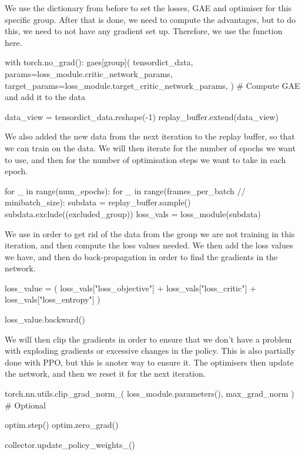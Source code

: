 We use the dictionary from before to set the losses, GAE and optimiser for this specific group. After that is done, we need to compute the advantages, but to do this, we need to not have any gradient set up. Therefore, we use the  function here.

\begin{mpy}
        with torch.no_grad():
            gaes[group](
                tensordict_data,
                params=loss_module.critic_network_params,
                target_params=loss_module.target_critic_network_params,
            )  # Compute GAE and add it to the data
    
        data_view = tensordict_data.reshape(-1)
        replay_buffer.extend(data_view)
\end{mpy}

We also added the new data from the next iteration to the replay buffer, so that we can train on the data. We will then iterate for the number of epochs we want to use, and then for the number of optimisation steps we want to take in each epoch.

\begin{mpy}
        for _ in range(num_epochs):
            for _ in range(frames_per_batch // minibatch_size):
                subdata = replay_buffer.sample()
                subdata.exclude((excluded_group))
                loss_vals = loss_module(subdata)
\end{mpy}

We use  in order to get rid of the data from the group we are not training in this iteration, and then compute the loss values needed. We then add the loss values we have, and then do back-propagation in order to find the gradients in the network.

\begin{mpy}
                loss_value = (
                    loss_vals["loss_objective"]
                    + loss_vals["loss_critic"]
                    + loss_vals["loss_entropy"]
                )
    
                loss_value.backward()
\end{mpy}

We will then clip the gradients in order to ensure that we don't have a problem with exploding gradients or excessive changes in the policy. This is also partially done with PPO, but this is anoter way to ensure it. The optimisers then update the network, and then we reset it for the next iteration.

\begin{mpy}
                torch.nn.utils.clip_grad_norm_(
                    loss_module.parameters(), max_grad_norm
                )  # Optional
    
                optim.step()
                optim.zero_grad()
                
    collector.update_policy_weights_()
\end{mpy}

